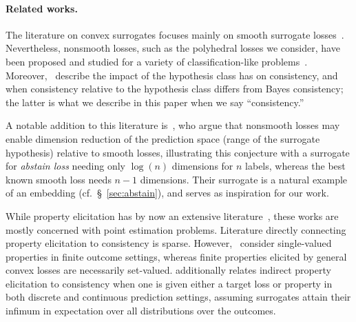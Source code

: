 \documentclass[12pt]{article}
\begin{document}
\paragraph{Related works.}
The literature on convex surrogates focuses mainly on smooth surrogate losses~\citep{crammer2001algorithmic,bartlett2006convexity,bartlett2008classification, duchi2018multiclass, williamson2016composite, reid2010composite,menon2019multilabel,zhang2020convex,bao2020calibrated}.
Nevertheless, nonsmooth losses, such as the polyhedral losses we consider, have been proposed and studied for a variety of classification-like problems~\citep{yang2018consistency,yu2018lovasz,lapin2015top}.
Moreover,~\citet{zhang2020bayes} describe the impact of the hypothesis class has on consistency, and when consistency relative to the hypothesis class differs from Bayes consistency; the latter is what we describe in this paper when we say ``consistency.''

A notable addition to this literature is~\citet{ramaswamy2018consistent}, who argue that nonsmooth losses may enable dimension reduction of the prediction space (range of the surrogate hypothesis) relative to smooth losses, illustrating this conjecture with a surrogate for \emph{abstain loss} needing only $\log(n)$ dimensions for $n$ labels, whereas the best known smooth loss needs $n-1$ dimensions.
Their surrogate is a natural example of an embedding (cf.~\S~\ref{sec:abstain}), and serves as inspiration for our work.


While property elicitation has by now an extensive literature~\citep{savage1971elicitation,osband1985information-eliciting,lambert2008eliciting,gneiting2011making,steinwart2014elicitation,frongillo2015vector-valued,fissler2016higher,lambert2018elicitation}, these works are mostly concerned with point estimation problems.
Literature directly connecting property elicitation to consistency is sparse.
However,~\citet{agarwal2015consistent} consider single-valued properties in finite outcome settings, whereas finite properties elicited by general convex losses are necessarily set-valued.
\citet{finocchiaro2021unifying} additionally relates indirect property elicitation to consistency when one is given either a target loss or property in both discrete and continuous prediction settings, assuming surrogates attain their infimum in expectation over all distributions over the outcomes.

\end{document}
